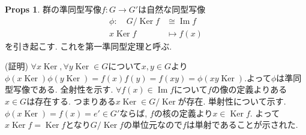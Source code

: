 \documentclass[dvipdfmx]{jsarticle}
\theoremstyle{definition}
\newtheorem{props}{Props}
\numberwithin{equation}{section}
\numberwithin{props}{section}
\numberwithin{definition}{section}
\numberwithin{note}{section}
\DeclareMathOperator{\Ker}{Ker}
\DeclareMathOperator{\Image}{Im}
\begin{document}
\begin{props}
     群の準同型写像$f\colon G\to G'$は自然な同型写像
     \begin{align}
          \phi:\quad G/\Ker f&\cong \Image f\\
          x\Ker f&\mapsto f(x)
     \end{align}
     を引き起こす. これを第一準同型定理と呼ぶ.
\end{props}
(証明) $\forall x\Ker , \forall y\Ker \in G$について$x,y\in G$より$\phi( x\Ker)\phi( y\Ker)=f(x)f(y)=f(xy)=\phi( xy\Ker)$.よって$\phi$は準同型写像である. 全射性を示す. $\forall f(x)\in \Image f$について$f$の像の定義よりある$x\in G$は存在する. つまりある$x\Ker \in G/\Ker $が存在. 単射性について示す.
$\phi(x\Ker )=f(x)=e'\in G'$ならば, $f$の核の定義より$x\in \Ker f$. よって$x\Ker f=\Ker f$となり$G/\Ker f$の単位元なので$f$は単射であることが示された. 
\end{document}
